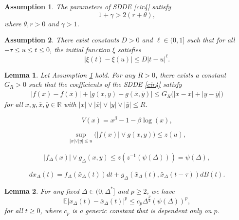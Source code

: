 \documentclass[10pt,a4paper]{amsart}
\newtheorem{assumption}{Assumption}
\newtheorem{lemma}{Lemma}
\begin{document}
\begin{assumption} \label{sec2:assump:1} 
The parameters of \textup{SDDE} \eqref{cir4} satisfy 
\begin{equation}
1+ \gamma > 2(r+\theta),
\end{equation}
where  $\theta, r>0$ and $\gamma>1$.
\end{assumption}

\begin{assumption}\label{sec2:assump:2} 
There exist constants $D>0$ and $\ell\in (0,1]$ such that for all $ -\tau\leq u \leq t \leq 0$, the initial function $\xi$ satisfies
\begin{equation}\label{eq:15}
  |\xi(t)-\xi(u)|\le D|t-u|^{\ell}.
\end{equation}
\end{assumption}

\begin{lemma}\label{lemma1}
Let Assumption \ref{sec2:assump:1} hold. For any $R>0$, there exists a constant $G_R>0$ such that the coefficients of the \textup{SDDE} \eqref{cir4} satisfy
\begin{align}
| f(x)-f(\bar{x}) | + | g(x,y)-g(\bar{x},\bar{y}) |
\le G_R \big( |x-\bar{x}| + |y-\bar{y}| \big)
\end{align}
for all $x,y,\bar{x},\bar{y}\in \mathbb{R}$ with 
$|x|\vee |\bar{x}|\vee |y|\vee |\bar{y}| \le R$.
\end{lemma}

\begin{equation}\label{sec2:eq1}
V(x)=x^{\beta}-1-\beta\log(x), 
\end{equation}

\begin{equation}\label{sec4:eq:1}
\sup_{\vert x\vert\vee\vert y\vert \le u}\Big(|f(x)|\vee g(x,y)\Big)\le z(u), 
\end{equation}

\begin{align}\label{sec4:eq:3}
|f_{\Delta}(x)|\vee g_{\Delta}(x,y)\le z(z^{-1}(\psi(\Delta)))=\psi(\Delta),
\end{align}

\begin{equation}\label{eq:30}
dx_{\Delta}(t)= f_{\Delta}(\bar{x}_{\Delta}(t))dt+g_{\Delta}(\bar{x}_{\Delta}(t),\bar{x}_{\Delta}(t-\tau))dB(t).
\end{equation}

\begin{lemma}\label{sec5:eq:L1}
For any fixed $\Delta\in (0,\Delta^*]$ and $p\ge 2$, we have 
\begin{equation}
 \mathbb{E}\vert x_{\Delta}(t)-\bar{x}_{\Delta}(t)\vert^{p}\le c_p\Delta^{\frac{p}{2}}(\psi(\Delta))^p,
\end{equation}
for all $t\geq 0$, where $c_p$ is a generic constant that is dependent only on $p$.
\end{lemma}
\end{document}
